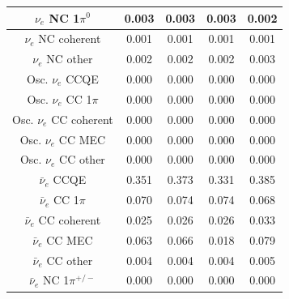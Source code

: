 \begin{table}
\begin{tabular} { | c ||c | c | c | c |  | }
$\nu_e$ NC 1$\pi^0$                               & 0.003               & 0.003               & 0.003               & 0.002                \\ \hline 
$\nu_e$ NC coherent                               & 0.001               & 0.001               & 0.001               & 0.001                \\ \hline 
$\nu_e$ NC other                                  & 0.002               & 0.002               & 0.002               & 0.003                \\ \hline 
Osc. $\nu_e$ CCQE                                 & 0.000               & 0.000               & 0.000               & 0.000                \\ \hline 
Osc. $\nu_e$ CC 1$\pi$                            & 0.000               & 0.000               & 0.000               & 0.000                \\ \hline 
Osc. $\nu_e$ CC coherent                          & 0.000               & 0.000               & 0.000               & 0.000                \\ \hline 
Osc. $\nu_e$ CC MEC                               & 0.000               & 0.000               & 0.000               & 0.000                \\ \hline 
Osc. $\nu_e$ CC other                             & 0.000               & 0.000               & 0.000               & 0.000                \\ \hline 
$\bar{\nu}_e$ CCQE                                & 0.351               & 0.373               & 0.331               & 0.385                \\ \hline 
$\bar{\nu}_e$ CC 1$\pi$                           & 0.070               & 0.074               & 0.074               & 0.068                \\ \hline 
$\bar{\nu}_e$ CC coherent                         & 0.025               & 0.026               & 0.026               & 0.033                \\ \hline 
$\bar{\nu}_e$ CC MEC                              & 0.063               & 0.066               & 0.018               & 0.079                \\ \hline 
$\bar{\nu}_e$ CC other                            & 0.004               & 0.004               & 0.004               & 0.005                \\ \hline 
$\bar{\nu}_e$ NC 1$\pi^{+/-}$                     & 0.000               & 0.000               & 0.000               & 0.000                \\ \hline 

\end{tabular}
\end{table}
